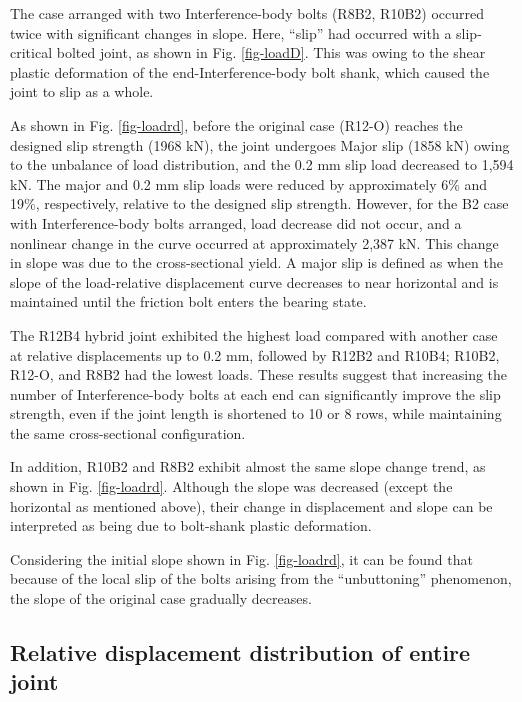 The case arranged with two Interference-body bolts (R8B2, R10B2) occurred twice with significant changes in slope. Here, ``slip'' had occurred with a slip-critical bolted joint, as shown in Fig. \ref{fig-loadD}. This was owing to the shear plastic deformation of the end-Interference-body bolt shank, which caused the joint to slip as a whole. 

As shown in Fig. \ref{fig-loadrd}, before the original case (R12-O) reaches the designed slip strength (1968 kN), the joint undergoes \ac{Major slip} (1858 kN) owing to the unbalance of load distribution, and the 0.2 mm slip load decreased to 1,594 kN. The major and 0.2 mm slip loads were reduced by approximately 6\% and 19\%, respectively, relative to the designed slip strength. However, for the B2 case with Interference-body bolts arranged, load decrease did not occur, and a nonlinear change in the curve occurred at approximately 2,387 kN. This change in slope was due to the cross-sectional yield. A major slip is defined as when the slope of the load-relative displacement curve decreases to near horizontal and is maintained until the friction bolt enters the bearing state. 

The R12B4 hybrid joint exhibited the highest load compared with another case at relative displacements up to 0.2 mm, followed by R12B2 and R10B4; R10B2, R12-O, and R8B2 had the lowest loads. These results suggest that increasing the number of Interference-body bolts at each end can significantly improve the slip strength, even if the joint length is shortened to 10 or 8 rows, while maintaining the same cross-sectional configuration.

In addition, R10B2 and R8B2 exhibit almost the same slope change trend, as shown in Fig. \ref{fig-loadrd}. Although the slope was decreased (except the horizontal as mentioned above), their change in displacement and slope can be interpreted as being due to bolt-shank plastic deformation. 

 Considering the initial slope shown in Fig. \ref{fig-loadrd}, it can be found that because of the local slip of the bolts arising from the ``unbuttoning'' phenomenon, the slope of the original case gradually decreases. 

\subsection{Relative displacement distribution of entire joint}

